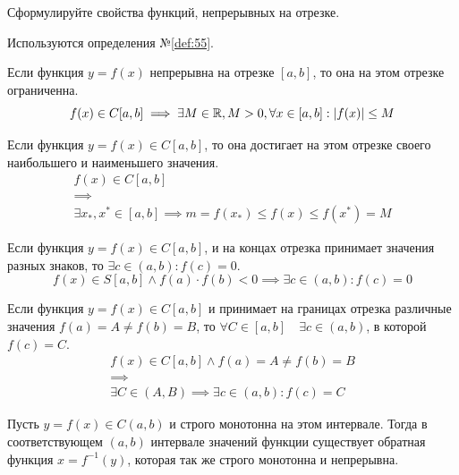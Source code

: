 \begin{question}
    Сформулируйте свойства функций, непрерывных на отрезке.
\end{question}
\begin{used}
    Используются определения №\ref{def:55}.
\end{used}
\begin{theorem}
    Если функция $y = f(x)$ непрерывна на отрезке $[a, b]$, то она на этом отрезке ограниченна. \[
        f(x) \in C[a, b] \implies \exists M \in \mathbb{R}, M > 0, \forall x \in [a, b] : |f(x)| \le  M
    \] 
\end{theorem}
\begin{theorem}
    Если функция $y = f(x) \in C[a, b]$, то она достигает на этом отрезке своего наибольшего и наименьшего значения.
    \begin{gather*}
        f(x) \in C[a, b] \\
        \implies \\
        \exists x_*, x^* \in [a, b] \implies m = f(x_*) \le f(x) \le f(x^*) = M
    \end{gather*}
\end{theorem}
\begin{theorem}
    Если функция $y = f(x) \in C[a, b]$, и на концах отрезка принимает значения разных знаков, то $\exists c \in (a, b) : f(c) = 0$. \[
        f(x) \in S[a, b] \land f(a) \cdot f(b) < 0 \implies \exists  c \in (a, b) : f(c) = 0
    \] 
\end{theorem}
\begin{theorem}
    Если функция $y = f(x) \in C[a, b]$ и принимает на границах отрезка различные значения $f(a) = A \neq f(b) = B$, то $\forall C \in [a, b] \quad \exists c \in (a, b)$, в которой $f(c) = C$.
    \begin{gather*}
        f(x) \in C[a, b] \land f(a) = A \neq f(b) = B \\
        \implies \\
        \exists C \in (A, B) \implies \exists c \in (a, b) : f(c) = C
    \end{gather*}
\end{theorem}
\begin{theorem}
    Пусть $y = f(x) \in C(a, b)$ и строго монотонна на этом интервале. Тогда в соответствующем $(a, b)$ интервале значений функции существует обратная функция $x = f^{-1}(y)$, которая так же строго монотонна и непрерывна.
\end{theorem}
\pagebreak


